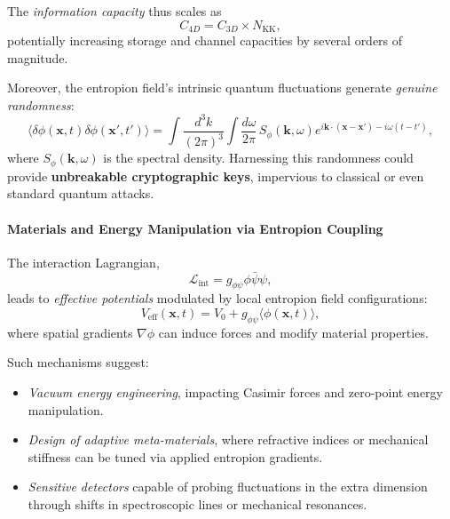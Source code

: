 \documentclass[12pt]{article}
\begin{document}
The \emph{information capacity} thus scales as
\begin{equation}
C_{4D} = C_{3D} \times N_{\mathrm{KK}},
\label{eq:information_capacity}
\end{equation}
potentially increasing storage and channel capacities by several orders of magnitude.

Moreover, the entropion field’s intrinsic quantum fluctuations generate \emph{genuine randomness}:
\begin{equation}
\langle \delta \phi(\mathbf{x}, t) \delta \phi(\mathbf{x}', t') \rangle = \int \frac{d^3k}{(2\pi)^3} \int \frac{d\omega}{2\pi} \, S_{\phi}(\mathbf{k}, \omega) e^{i \mathbf{k} \cdot (\mathbf{x} - \mathbf{x}') - i \omega (t - t')},
\label{eq:entropion_noise_spectrum}
\end{equation}
where \(S_{\phi}(\mathbf{k}, \omega)\) is the spectral density. Harnessing this randomness could provide \textbf{unbreakable cryptographic keys}, impervious to classical or even standard quantum attacks.

\paragraph{Materials and Energy Manipulation via Entropion Coupling}

The interaction Lagrangian,
\begin{equation}
\mathcal{L}_{\mathrm{int}} = g_{\phi \psi} \phi \bar{\psi} \psi,
\label{eq:interaction_lagrangian}
\end{equation}
leads to \emph{effective potentials} modulated by local entropion field configurations:
\begin{equation}
V_{\mathrm{eff}}(\mathbf{x}, t) = V_0 + g_{\phi \psi} \langle \phi(\mathbf{x}, t) \rangle,
\label{eq:effective_potential_shift}
\end{equation}
where spatial gradients \(\nabla \phi\) can induce forces and modify material properties.

Such mechanisms suggest:
\begin{itemize}
    \item \emph{Vacuum energy engineering}, impacting Casimir forces and zero-point energy manipulation.
    \item \emph{Design of adaptive meta-materials}, where refractive indices or mechanical stiffness can be tuned via applied entropion gradients.
    \item \emph{Sensitive detectors} capable of probing fluctuations in the extra dimension through shifts in spectroscopic lines or mechanical resonances.
\end{itemize}
\end{document}
